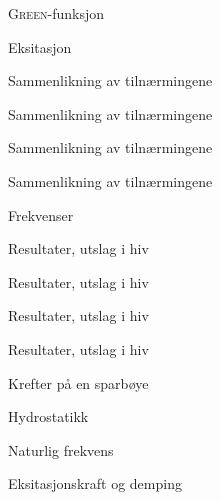 \documentclass[gray]{beamer}
\begin{document}
\begin{frame}{\textsc{Green}-funksjon}
  
\end{frame}

\begin{frame}{Eksitasjon}
  
\end{frame}
\begin{frame}{Sammenlikning av tilnærmingene}
  
\end{frame}
\begin{frame}{Sammenlikning av tilnærmingene}
  
\end{frame}
\begin{frame}{Sammenlikning av tilnærmingene}
  
\end{frame}
\begin{frame}{Sammenlikning av tilnærmingene}
  
\end{frame}

\begin{frame}{Frekvenser}
  
\end{frame}

\begin{frame}{Resultater, utslag i hiv}
  
\end{frame}

\begin{frame}{Resultater, utslag i hiv}
  
\end{frame}

\begin{frame}{Resultater, utslag i hiv}
  
\end{frame}

\begin{frame}{Resultater, utslag i hiv}
  
\end{frame}

\begin{frame}{Krefter på en sparbøye}
  
\end{frame}
\begin{frame}{Hydrostatikk}
  
\end{frame}
\begin{frame}{Naturlig frekvens}
  
\end{frame}
\begin{frame}{Eksitasjonskraft og demping}
  
\end{frame}
\end{document}
